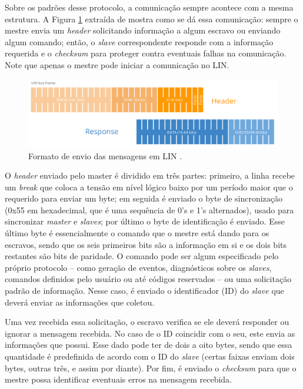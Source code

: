 Sobre os padrões desse protocolo, a comunicação sempre acontece com a mesma estrutura. A Figura \ref{fig:lin_estrutura} extraída de \cite{css:2021} mostra como se dá essa comunicação: sempre o mestre envia um \textit{header} solicitando informação a algum escravo ou enviando algum comando; então, o \textit{slave} correspondente responde com a informação requerida e o \textit{checksum} para proteger contra eventuais falhas na comunicação. Note que apenas o mestre pode iniciar a comunicação no LIN.

\begin{figure}[htb]
    \centering
    \includegraphics[width=.73\textwidth]{../figs/lin-estrutura}
    \caption{Formato de envio das mensagens em LIN \cite{css:2021}.}
    \label{fig:lin_estrutura}
\end{figure}

O \textit{header} enviado pelo master é dividido em três partes: primeiro, a linha recebe um \textit{break} que coloca a tensão em nível lógico baixo por um período maior que o requerido para enviar um byte; em seguida é enviado o byte de sincronização (0x55 em hexadecimal, que é uma sequência de 0's e 1's alternados), usado para sincronizar \textit{master} e \textit{slaves}; por último o byte de identificação é enviado. Esse último byte é essencialmente o comando que o mestre está dando para os escravos, sendo que os seis primeiros bits são a informação em si e os dois bits restantes são bits de paridade. O comando pode ser algum especificado pelo próprio protocolo -- como geração de eventos, diagnósticos sobre os \textit{slaves}, comandos definidos pelo usuário ou até códigos reservados -- ou uma solicitação padrão de informação. Nesse caso, é enviado o identificador (ID) do \textit{slave} que deverá enviar as informações que coletou.

Uma vez recebida essa solicitação, o escravo verifica se ele deverá responder ou ignorar a mensagem recebida. No caso de o ID coincidir com o seu, este envia as informações que possui. Esse dado pode ter de dois a oito bytes, sendo que essa quantidade é predefinida de acordo com o ID do \textit{slave} (certas faixas enviam dois bytes, outras três, e assim por diante). Por fim, é enviado o \textit{checksum} para que o mestre possa identificar eventuais erros na mensagem recebida.

